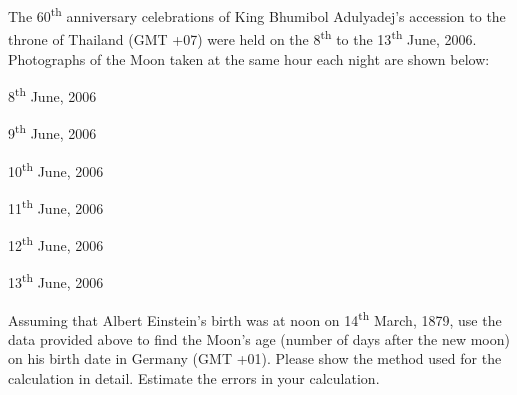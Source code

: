 The 60\textsuperscript{th} anniversary celebrations of King Bhumibol
Adulyadej's accession to the throne of Thailand (GMT +07) were held on the
8\textsuperscript{th} to the 13\textsuperscript{th} June, 2006. Photographs of
the Moon taken at the same hour each night are shown below:

\begin{center}
8\textsuperscript{th} June, 2006
\end{center}

\begin{center}
9\textsuperscript{th} June, 2006
\end{center}

\begin{center}
10\textsuperscript{th} June, 2006
\end{center}

\begin{center}
11\textsuperscript{th} June, 2006
\end{center}

\begin{center}
12\textsuperscript{th} June, 2006
\end{center}

\begin{center}
13\textsuperscript{th} June, 2006
\end{center}

Assuming that Albert Einstein's birth was at noon on 14\textsuperscript{th}
March, 1879, use the data provided above to find the Moon's age (number of days
after the new moon) on his birth date in Germany (GMT +01). Please show the
method used for the calculation in detail. Estimate the errors in your
calculation.
